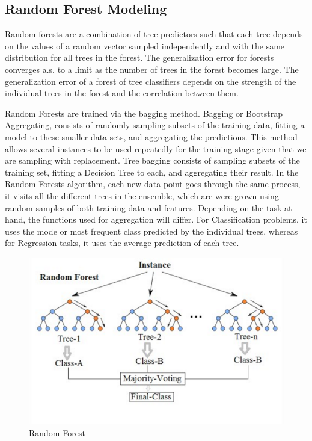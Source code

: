 \subsection{Random Forest Modeling}
Random forests are a combination of tree predictors
such that each tree depends on the values of a random
vector sampled independently and with the same
distribution for all trees in the forest. The
generalization error for forests converges a.s. to a limit
as the number of trees in the forest becomes large.
The generalization error of a forest of tree classifiers
depends on the strength of the individual trees in the
forest and the correlation between them. 
\par
Random Forests are trained via the bagging method. Bagging or Bootstrap Aggregating, consists of randomly sampling subsets of the training data, fitting a model to these smaller data sets, and aggregating the predictions. This method allows several instances to be used repeatedly for the training stage given that we are sampling with replacement. Tree bagging consists of sampling subsets of the training set, fitting a Decision Tree to each, and aggregating their result.
In the Random Forests algorithm, each new data point goes through the same process, it visits all the different trees in the ensemble, which are were grown using random samples of both training data and features. Depending on the task at hand, the functions used for aggregation will differ. For Classification problems, it uses the mode or most frequent class predicted by the individual trees, whereas for Regression tasks, it uses the average prediction of each tree.
\begin{figure}[h]
\label{ss}
\centering
\includegraphics[width= 10 cm]{rf.png}
\caption{Random Forest}
\end{figure}
